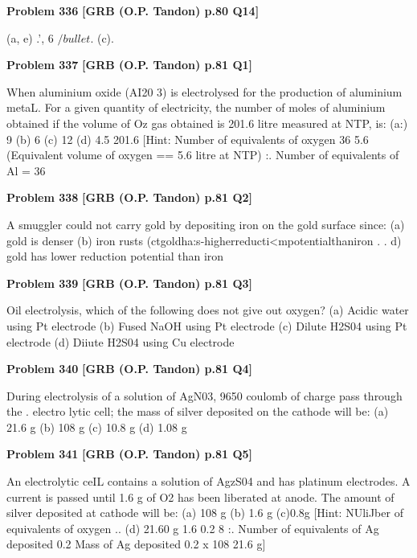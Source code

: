 \begin{problembox}
\textbf{Problem 336} \hfill \textbf{[GRB (O.P. Tandon) p.80 Q14]}
\label{q:ext-grb_all_questions-336}

(a, e) 
.', 
6 $/bullet$. (c).
\end{problembox}

\begin{problembox}
\textbf{Problem 337} \hfill \textbf{[GRB (O.P. Tandon) p.81 Q1]}
\label{q:ext-grb_all_questions-337}

When aluminium oxide (AI20 3) is electrolysed for the 
production of aluminium metaL. For a given quantity of 
electricity, the number of moles of aluminium obtained if the 
volume of Oz gas obtained is 201.6 litre measured at NTP, is: 
(a:) 9 
(b) 6 
(c) 12 
(d) 4.5 
201.6 
[Hint: 
Number of equivalents of oxygen 
36 
5.6 
(Equivalent volume of oxygen == 5.6 litre at NTP) 
:. Number of equivalents of Al = 36
\end{problembox}

\begin{problembox}
\textbf{Problem 338} \hfill \textbf{[GRB (O.P. Tandon) p.81 Q2]}
\label{q:ext-grb_all_questions-338}

A smuggler could not carry gold by depositing iron on the gold 
surface since: 
(a) gold is denser 
(b) iron rusts 
(ctgoldha:s-higherreducti<mpotentialthaniron . 
. d) gold has lower reduction potential than iron
\end{problembox}

\begin{problembox}
\textbf{Problem 339} \hfill \textbf{[GRB (O.P. Tandon) p.81 Q3]}
\label{q:ext-grb_all_questions-339}

Oil electrolysis, which of the following does not give out 
oxygen? 
(a) Acidic water using Pt electrode 
(b) Fused NaOH using Pt electrode 
(c) Dilute H2S04 using Pt electrode 
(d) Diiute H2S04 using Cu electrode
\end{problembox}

\begin{problembox}
\textbf{Problem 340} \hfill \textbf{[GRB (O.P. Tandon) p.81 Q4]}
\label{q:ext-grb_all_questions-340}

During electrolysis of a solution of AgN03, 9650 coulomb of 
charge pass through the . electro lytic cell; the mass of silver 
deposited on the cathode will be: 
(a) 21.6 g 
(b) 108 g 
(c) 10.8 g 
(d) 1.08 g
\end{problembox}

\begin{problembox}
\textbf{Problem 341} \hfill \textbf{[GRB (O.P. Tandon) p.81 Q5]}
\label{q:ext-grb_all_questions-341}

An electrolytic ceIL contains a solution of AgzS04 and has 
platinum electrodes. A current is passed until 1.6 g of O2 has 
been liberated at anode. The amount of silver deposited at 
cathode will be: 
(a) 108 g 
(b) 1.6 g 
(c)0.8g 
[Hint: 
NUliJber of equivalents of oxygen 
.. 
(d) 21.60 g 
1.6 
0.2 
8 
:. Number of equivalents of Ag deposited 
0.2 
Mass of Ag deposited 
0.2 x 108 
21.6 g]
\end{problembox}

